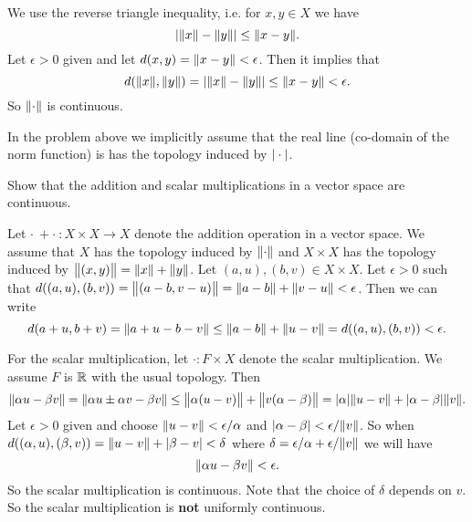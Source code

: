 \begin{solution}
	We use the reverse triangle inequality, i.e. for $ x,y \in X $ we have
	\[ |\norm{x} - \norm{y}| \leq \norm{x-y}. \]
	Let $ \epsilon>0 $ given and let $ d(x,y)=\norm{x-y}<\epsilon $. Then it implies that
	\[ d(\norm{x},\norm{y}) = |\norm{x} - \norm{y}| \leq \norm{x-y} <\epsilon. \]
	So $ \norm{\cdot} $ is continuous.
\end{solution}
\begin{remark}
	In the problem above we implicitly assume that the real line (co-domain of the norm function) is has the topology induced by $ |\cdot| $.
\end{remark}

\begin{problem}
	Show that the addition and scalar multiplications in a vector space are continuous.
\end{problem}
\begin{solution}
	Let $ \cdot\ + \cdot\ : X\times X \to X $ denote the addition operation in a vector space. We assume that $ X $ has the topology induced by $ \norm{\cdot} $ and $ X\times X $ has the topology induced by $ \norm{(x,y)} = \norm{x} + \norm{y} $. Let $ (a,u),(b,v)\in X\times X $. Let $ \epsilon>0 $ such that $ d((a,u),(b,v)) = \norm{(a-b,v-u)} = \norm{a-b} + \norm{v-u} < \epsilon $. Then we can write
	\[ d(a+u,b+v) = \norm{a+u-b-v} \leq \norm{a-b}+\norm{u-v} = d((a,u),(b,v))<\epsilon. \]
	
	For the scalar multiplication, let $ \cdot: F\times X $ denote the scalar multiplication. We assume $ F $ is $ \mathbb{R} $ with the usual topology. Then 
	\[ \norm{\alpha u - \beta v} = \norm{\alpha u \pm \alpha v - \beta v} \leq \norm{\alpha(u-v)} + \norm{v(\alpha-\beta)} = |\alpha|\norm{u-v} + |\alpha-\beta|\norm{v}. \]
	Let $ \epsilon >0 $ given and choose $ \norm{u-v} < \epsilon/\alpha $ and $ |\alpha-\beta|<\epsilon/\norm{v} $. So when $ d((\alpha,u),(\beta,v)) = \norm{u-v}+|\beta-v| < \delta $ where $ \delta = \epsilon/\alpha + \epsilon/\norm{v} $ we will have
	\[ \norm{\alpha u - \beta v} < \epsilon. \] 
	So the scalar multiplication is continuous. Note that the choice of $ \delta $ depends on $ v $. So the scalar multiplication is \textbf{not} uniformly continuous.
\end{solution}

